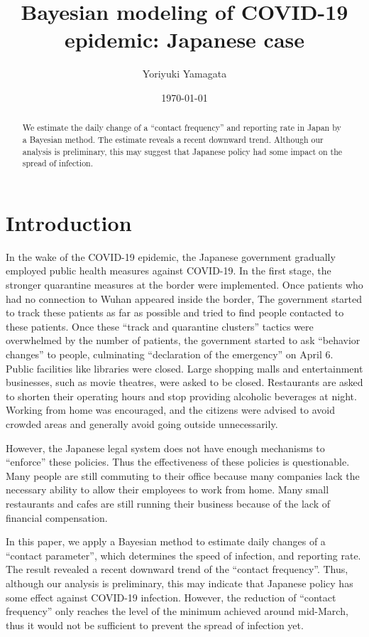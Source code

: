 \documentclass{amsart}
\title{Bayesian modeling of COVID-19 epidemic: Japanese case}
\author{Yoriyuki Yamagata}
\date{\today}
\begin{document}
\maketitle

\begin{abstract}
 We estimate the daily change of a ``contact frequency'' and reporting rate in Japan by a Bayesian method.
 The estimate reveals a recent downward trend.
 Although our analysis is preliminary, this may suggest that Japanese policy had some impact on the spread of infection.
\end{abstract}

\section{Introduction}

In the wake of the COVID-19 epidemic, the Japanese government gradually employed public health measures against COVID-19.
In the first stage, the stronger quarantine measures at the border were implemented.
Once patients who had no connection to Wuhan appeared inside the border, The government started to track these patients as far as possible and tried to find people contacted to these patients.
Once these ``track and quarantine clusters'' tactics were overwhelmed by the number of patients, the government started to ask ``behavior changes'' to people, culminating ``declaration of the emergency'' on April 6.
Public facilities like libraries were closed.
Large shopping malls and entertainment businesses, such as movie theatres, were asked to be closed.
Restaurants are asked to shorten their operating hours and stop providing alcoholic beverages at night.
Working from home was encouraged, and the citizens were advised to avoid crowded areas and generally avoid going outside unnecessarily.

However, the Japanese legal system does not have enough mechanisms to ``enforce'' these policies.
Thus the effectiveness of these policies is questionable.
Many people are still commuting to their office because many companies lack the necessary ability to allow their employees to work from home.
Many small restaurants and cafes are still running their business because of the lack of financial compensation.

In this paper, we apply a Bayesian method to estimate daily changes of a ``contact parameter'', which determines the speed of infection, and reporting rate.
The result revealed a recent downward trend of the ``contact frequency''.
Thus, although our analysis is preliminary, this may indicate that Japanese policy has some effect against COVID-19 infection.
However, the reduction of ``contact frequency'' only reaches the level of the minimum achieved around mid-March, thus it would not be sufficient to prevent the spread of infection yet.
\end{document}
